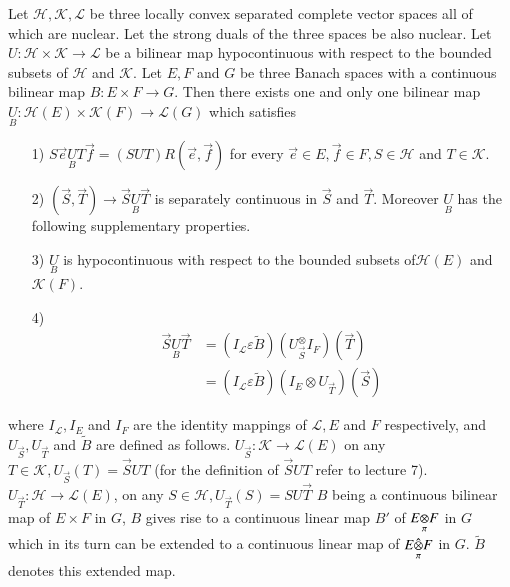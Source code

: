 \setcounter{section}{14}
\setcounter{theorem}{0}
\begin{theorem}\label{chap14:thm14.1}
Let $\mathscr{H}, \mathscr{K}, \mathscr{L}$ be three locally convex
separated complete vector spaces all of which are nuclear. Let the
strong duals of the three spaces be also nuclear. Let $U : \mathscr{H}
\times \mathscr{K} \to \mathscr{L}$ be a bilinear map hypocontinuous
with respect to the bounded subsets of $\mathscr{H}$ and
$\mathscr{K}$. Let $E, F$ and $G$ be three Banach spaces with a
continuous bilinear map $B : E \times F \to G$. Then there exists one
and only one bilinear map $\underset{B}{U} : \mathscr{H}(E) \times
\mathscr{K}(F) \to \mathscr{L}(G)$ which satisfies 
\begin{itemize}
\item [1)] $S \overrightarrow{e} \underset{B}{U} T \overrightarrow{f}
  = (S U T) R(\overrightarrow{e}, \overrightarrow{f})$ for every
  $\overrightarrow{e} \in E, \overrightarrow{f} \in F, S \in
  \mathscr{H}$ and $T \in \mathscr{K}$.
\item [2)] $(\overrightarrow{S}, \overrightarrow{T}) \to
  \overrightarrow{S} \underset{B}{U} \overrightarrow{T}$ is separately
  continuous in $\overrightarrow{S}$ and
  $\overrightarrow{T}$. Moreover $\underset{B}{U}$ has the following
  supplementary properties.
\item [3)] $\underset{B}{U}$ is hypocontinuous with respect to the
  bounded subsets of\break $\mathscr{H}(E)$ and $\mathscr{K}(F)$. 
\item [4)] \begin{align*}
  \overrightarrow{S} \underset{B}{U} \overrightarrow{T} & =
(I_{\mathscr{L}} \varepsilon \tilde{B})
(U_{\overrightarrow{S}}^{\otimes} I_F) (\overrightarrow{T})\\
&= (I_{\mathscr{L}} \varepsilon \tilde{B}) (I_E \otimes
 U_{\overrightarrow{T}}) (\overrightarrow{S})
\end{align*} 
\end{itemize}
where $I_{\mathscr{L}}, I_E$ and $I_F$ are the identity mappings of
$\mathscr{L}, E$ and $F$ respectively, and $U_{\overrightarrow{S}},
U_{\overrightarrow{T}}$ and $\tilde{B}$ are defined as
follows. $U_{\overrightarrow{S}} : \mathscr{K} \to \mathscr{L}(E)$ on
any $T \in \mathscr{K}, U_{\overrightarrow{S}}(T) = \overrightarrow{S}
U T$ (for the definition of $\overrightarrow{S} U T$ refer to lecture
7). $U_{\overrightarrow{T}} : \mathscr{H} \to \mathscr{L}(E)$, on any
$S \in \mathscr{H}, U_{\overrightarrow{T}}(S) = S U
\overrightarrow{T}$ $B$ being a continuous bilinear map of $E \times
F$ in $G$, $B$ gives rise to a continuous linear map $B'$ of $\foprod{E}{F}{\pi}$
in $G$ which in its turn can be extended to a continuous linear map of
$\fohprod{E}{F}{\pi}$ in $G$. $\tilde{B}$ denotes this extended map. 
\end{theorem}

